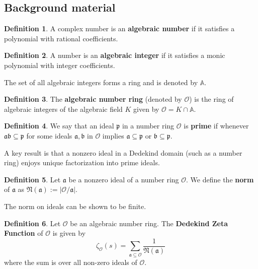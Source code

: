 \documentclass[10pt,a4paper]{article}
\theoremstyle{definition}
\newtheorem{definition}{Definition}[section]
\theoremstyle{remark}
\newcommand{\f}[1]{\mathfrak{#1}}
\begin{document}
\subsection{Background material}

 
	\begin{definition} A complex number is an \textbf{algebraic number} if it satisfies a polynomial with rational coefficients.
	\end{definition}

	\begin{definition}A number is an \textbf{algebraic integer} if it satisfies a monic polynomial with integer coefficients.
		
		The set of all algebraic integers forms a ring and is denoted by \(\mathbb{A}\).
	\end{definition}

	\begin{definition} The \textbf{algebraic number ring} (denoted by \(\mathcal{O}\)) is the ring of algebraic integers of the algebraic field \(K\) given by \(\mathcal{O}=K\cap \mathbb{A}\). 
	\end{definition}

	\begin{definition} 
		We say that an ideal \(\f{p}\) in a number ring $\mathcal{O}$ is \textbf{prime} if whenever \(\f{ab}\subseteq \f{p}\) for some ideals \(\f{a},\f{b}\) in $\mathcal{O}$ implies \(\f{a}\subseteq \f{p}\) or \(\f{b} \subseteq \f{p}\).  
	\end{definition}
A key result is that a nonzero ideal in a Dedekind domain (such as a number ring) enjoys unique factorization into prime ideals. 

\begin{definition} \label{ideal-norm}
		Let $\mathfrak{a}$ be a nonzero ideal of a number ring $\mathcal{O}$. We
		define the \textbf{norm} of \(\f{a}\) as \(\f{N(a)}:=|\mathcal{O}/\f{a}|\).
	\end{definition}

The norm on ideals can be shown to be finite. \cite{marcus_number_2012} 
	
\begin{definition} Let \(\mathcal{O}\) be an algebraic number ring. The \textbf{Dedekind Zeta Function} of \(\mathcal{O}\) is given by \begin{equation}
			\zeta_\mathcal{O}(s)=\sum_{\f{a\subseteq \mathcal{O}}}\frac{1}{\f{N(a)}}
		\end{equation} where the sum is over all non-zero ideals of \(\mathcal{O}\).
	\end{definition}
\end{document}
